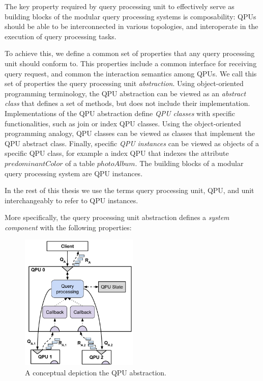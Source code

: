 The key property required by query processing unit to effectively serve as building blocks of the modular query
processing systems is composability:
QPUs should be able to be interconnected in various topologies, and interoperate in the execution of query processing tasks.

To achieve this, we define a common set of properties that any query processing unit should conform to.
This properties include a common interface for receiving query request, and common the interaction semantics among QPUs.
We call this set of properties the query processing unit \textit{abstraction}.
Using object-oriented programming terminology, the QPU abstraction can be viewed as an \textit{abstract class}
that defines a set of methods, but does not include their implementation.
Implementations of the QPU abstraction define \textit{QPU classes} with specific functionalities,
such as join or index QPU classes.
Using the object-oriented programming analogy, QPU classes can be viewed as classes that implement the QPU
abstract class.
Finally, specific \textit{QPU instances} can be viewed as objects of a specific QPU class, for example a index QPU that
indexes the attribute $predominantColor$ of a table $photoAlbum$.
The building blocks of a modular query processing system are QPU instances.

In the rest of this thesis we use the terms query processing unit, QPU, and unit interchangeably to refer to QPU instances.

\bigskip

More specifically, the query processing unit abstraction defines a \textit{system component} with the following properties:

\begin{figure}[t]
  \centering
    \includegraphics[width=0.5\textwidth]{./figures/design_pattern/qpu_abstraction.pdf}
  \caption{A conceptual depiction the QPU abstraction.}
  \label{fig:qpu_abstraction}
\end{figure}

